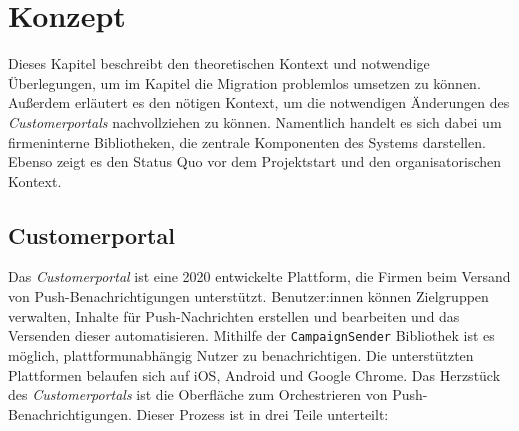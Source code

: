 \chapter{Konzept}
\label{cha:design}

Dieses Kapitel beschreibt den theoretischen Kontext und notwendige Überlegungen, um im Kapitel  die Migration problemlos umsetzen zu können. Außerdem erläutert es den nötigen Kontext, um die notwendigen Änderungen des \textit{Customerportals} nachvollziehen zu können. Namentlich handelt es sich dabei um firmeninterne Bibliotheken, die zentrale Komponenten des Systems darstellen. Ebenso zeigt es den Status Quo vor dem Projektstart und den organisatorischen Kontext.

\section{Customerportal}

Das \textit{Customerportal} ist eine 2020 entwickelte Plattform, die Firmen beim Versand von Push-Benachrichtigungen unterstützt. Benutzer:innen können Zielgruppen verwalten, Inhalte für Push-Nachrichten erstellen und bearbeiten und das Versenden dieser automatisieren. Mithilfe der \texttt{CampaignSender} Bibliothek ist es möglich, plattformunabhängig Nutzer zu benachrichtigen. Die unterstützten Plattformen belaufen sich auf iOS, Android und Google Chrome. Das Herzstück des \textit{Customerportals} ist die Oberfläche zum Orchestrieren von Push-Benachrichtigungen. Dieser Prozess ist in drei Teile unterteilt:

